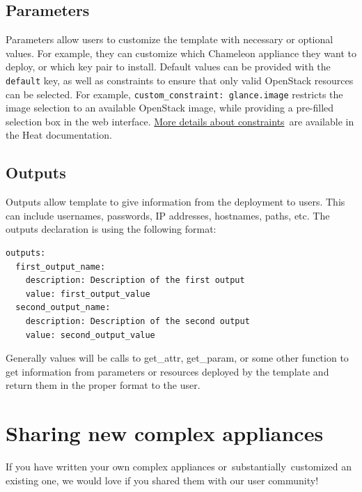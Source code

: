 \subsection{Parameters}\label{parameters}

Parameters allow users to customize the template with necessary or
optional values. For example, they can customize which Chameleon
appliance they want to deploy, or which key pair to install. Default
values can be provided with the \texttt{default} key, as well as
constraints to ensure that only valid OpenStack resources can be
selected. For example, \texttt{custom\_constraint:\ glance.image}
restricts the image selection to an available OpenStack image, while
providing a pre-filled selection box in the web interface.
\href{http://docs.openstack.org/developer/heat/template_guide/hot_spec.html\#parameter-constraints}{More
details about constraints}~are available in the Heat documentation.

\subsection{Outputs}\label{outputs}

Outputs allow template to give information from the deployment to users.
This can include usernames, passwords, IP addresses, hostnames, paths,
etc. The outputs declaration is using the following format:

\begin{footnotesize}
\begin{verbatim}
outputs:
  first_output_name:
    description: Description of the first output
    value: first_output_value
  second_output_name:
    description: Description of the second output
    value: second_output_value
\end{verbatim}
\end{footnotesize}

Generally values will be calls to get\_attr, get\_param, or some other
function to get information from parameters or resources deployed by the
template and return them in the proper format to the user.

\section{Sharing new complex
appliances}\label{sharing-new-complex-appliances}

If you have written your own complex appliances
or~substantially~customized an existing one, we would love if you shared
them with our user community!

